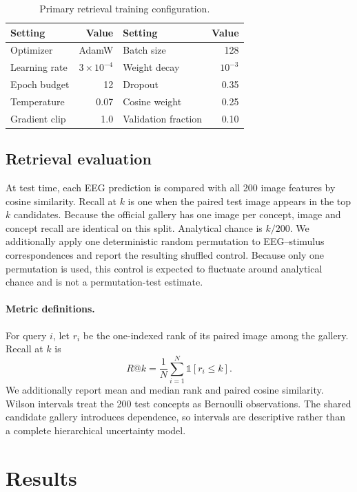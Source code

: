 \documentclass[10pt]{article}
\begin{document}
\begin{table}[t]
  \centering
  \caption{Primary retrieval training configuration.}
  \label{tab:hyperparameters}
  \begin{tabular}{lr@{\qquad}lr}
    \toprule
    Setting & Value & Setting & Value\\
    \midrule
    Optimizer & AdamW & Batch size & 128\\
    Learning rate & $3\times10^{-4}$ & Weight decay & $10^{-3}$\\
    Epoch budget & 12 & Dropout & 0.35\\
    Temperature & 0.07 & Cosine weight & 0.25\\
    Gradient clip & 1.0 & Validation fraction & 0.10\\
    \bottomrule
  \end{tabular}
\end{table}

\subsection{Retrieval evaluation}

At test time, each EEG prediction is compared with all 200 image features by
cosine similarity. Recall at $k$ is one when the paired test image appears in
the top $k$ candidates. Because the official gallery has one image per
concept, image and concept recall are identical on this split. Analytical
chance is $k/200$. We additionally apply one deterministic random permutation
to EEG--stimulus correspondences and report the resulting shuffled control.
Because only one permutation is used, this control is expected to fluctuate
around analytical chance and is not a permutation-test estimate.

\paragraph{Metric definitions.}
For query $i$, let $r_i$ be the one-indexed rank of its paired image among the
gallery. Recall at $k$ is
\[
  R@k = \frac{1}{N}\sum_{i=1}^{N}\mathbb{1}[r_i\leq k].
\]
We additionally report mean and median rank and paired cosine similarity.
Wilson intervals treat the 200 test concepts as Bernoulli observations. The
shared candidate gallery introduces dependence, so intervals are descriptive
rather than a complete hierarchical uncertainty model.

\section{Results}
\end{document}

